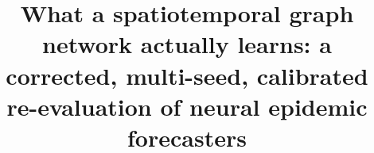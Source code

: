 \documentclass[final,1p,times]{elsarticle}
\begin{document}
\begin{frontmatter}

\title{What a spatiotemporal graph network actually learns: a corrected,
       multi-seed, calibrated re-evaluation of neural epidemic forecasters}



\end{frontmatter}
\end{document}
